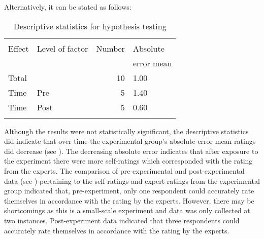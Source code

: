 \documentclass[output=paper]{langsci/langscibook}
\begin{document}
Alternatively, it can be stated as follows: 

\begin{table}
\begin{tabular}{llrl}
\lsptoprule
\multicolumn{4}{c}{Descriptive statistics}\\\cmidrule(lr){1-4}
Effect & Level of factor & Number & Absolute\\
		&				&		  & error mean\\\midrule
Total &  & 10 & 1.00\\
Time & Pre & 5 & 1.40\\
Time & Post & 5 & 0.60\\
\lspbottomrule
\end{tabular}
\caption{\label{tab:deysel:4}Descriptive statistics for hypothesis testing}
\end{table}

\begin{table}
\caption{\label{tab:deysel:5}Experimental group ratings pre- and post-experiment}
\end{table}

Although the results were not statistically significant, the descriptive statistics did indicate that over time the experimental group’s absolute error mean ratings did decrease (see ). The decreasing absolute error indicates that after exposure to the experiment there were more self-ratings which corresponded with the rating from the experts. The comparison of pre-experimental and post-experimental data (see ) pertaining to the self-ratings and expert-ratings from the experimental group indicated that, pre-experiment, only one respondent could accurately rate themselves in accordance with the rating by the experts. However, there may be shortcomings as this is a small-scale experiment and data was only collected at two instances. Post-experiment data indicated that three respondents could accurately rate themselves in accordance with the rating by the experts.
\end{document}
